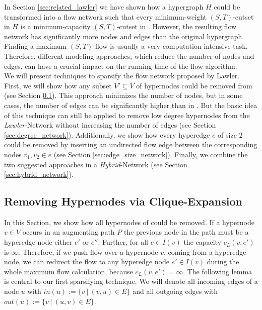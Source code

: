 
In Section \ref{sec:related_lawler} we have shown how a hypergraph $H$ could be transformed into 
a flow network  such that every minimum-weight $(S,T)$-cutset in $H$ is a
minimum-capacity $(S,T)$-cutset in  \cite{lawler1973}. However, the resulting flow
network has significantly more nodes and edges than the original hypergraph. Finding a
maximum $(S,T)$-flow is usually a very computation intensive task. 
Therefore, different modeling approaches, which reduce the number of nodes and edges,
can have a crucial impact on the running time of the flow algorithm. \\
We will present techniques to sparsify the flow network 
proposed by Lawler. First, we will show how any subset $V' \subseteq V$ of hypernodes could be removed 
from  (see Section \ref{sec:heuer_network}). This approach minimizes
the number of nodes, but in some cases, the number of edges can be
significantly higher than in . But the basic idea of this technique 
can still be applied to remove low degree hypernodes from the \emph{Lawler}-Network without 
increasing the number of edges (see Section \ref{sec:degree_network}). Additionally, we show
how every hyperedge $e$ of size $2$ could be removed by inserting an undirected flow edge between
the corresponding nodes $v_1,v_2 \in e$  (see Section \ref{sec:edge_size_network}). 
Finally, we combine the two suggested approaches in a \emph{Hybrid}-Network 
(see Section \ref{sec:hybrid_network}).



\subsection{Removing Hypernodes via Clique-Expansion}
\label{sec:heuer_network}

In this Section, we show how all hypernodes of  could be removed. If a hypernode $v \in V$
occurs in an augmenting path $P$ the previous node in the path must be a hyperedge node either
$e'$ or $e''$. Further, for all $e \in I(v)$ the capacity $c_L(v,e')$ is $\infty$. Therefore, 
if we push flow over a hypernode $v$, coming from a hyperedge node, we can redirect
the flow to any hyperedge node $e' \in I(v)$ during the whole maximum flow calculation, because 
$c_L(v,e') = \infty$. The following lemma is central to our first sparsifying 
technique. We will denote all incoming edges of a node $u$ with
$in(u) := \{v\ |\ (v,u) \in E\}$ and all outgoing edges with 
$out(u) := \{v\ |\ (u,v) \in E\}$. 

